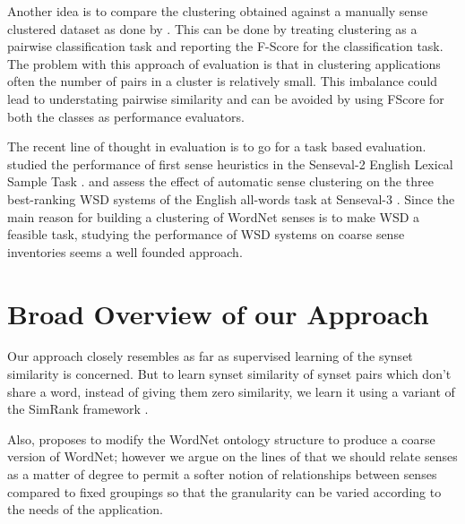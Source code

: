Another idea is to compare the clustering obtained against a manually sense clustered dataset as done by \citep{chklovski2003exploiting}. This can be done by treating clustering as a pairwise classification task and reporting the F-Score for the classification task. The problem with this approach of evaluation is that in clustering applications often the number of pairs in a cluster is relatively small. This imbalance could lead to understating pairwise similarity and can be avoided by using FScore for both the classes as performance evaluators.

The recent line of thought in evaluation is to go for a task based evaluation. \citep{mccarthy2006relating} studied the performance of first sense heuristics in the Senseval-2 English Lexical Sample Task \citep{Senseval2LexicalSampleTask}. \citep{Navigli06meaningfulclustering} and \citep{snow07mergesense} assess the effect of automatic sense clustering on the three best-ranking WSD systems of the English all-words task at Senseval-3 \citep{Senseval3AllWordsTask}. Since the main reason for building a clustering of WordNet senses is to make WSD a feasible task, studying the performance of WSD systems on coarse sense inventories seems a well founded approach.

\section{Broad Overview of our Approach}
Our approach closely resembles \citep{snow07mergesense} as far as supervised learning of the synset similarity is concerned. But to learn synset similarity of synset pairs which don't share a word, instead of giving them zero similarity, we learn it using a variant of the SimRank framework \citep{Jeh02simrank}. 

Also, \citep{snow07mergesense} proposes to modify the WordNet ontology structure to produce a coarse version of WordNet; however we argue on the lines of \citep{mccarthy2006relating} that we should relate senses as a matter of degree to permit a softer notion of relationships between senses compared to fixed groupings so that the granularity can be varied according to the needs of the application.

\begin{comment}
\subsection{Understanding sense clustering}
When we merge two synsets, should we modify the underlying structure of taxonomy as well?
What should be the repercussion of the mergings on the taxonomy?

An important point to note here is that if we merge two synsets and introduce the merged synsets instead of the original synsets in the WordNet taxonomy, either we'll be adding some spurious relations and/or we'll be losing some relationship information.

\end{comment}

